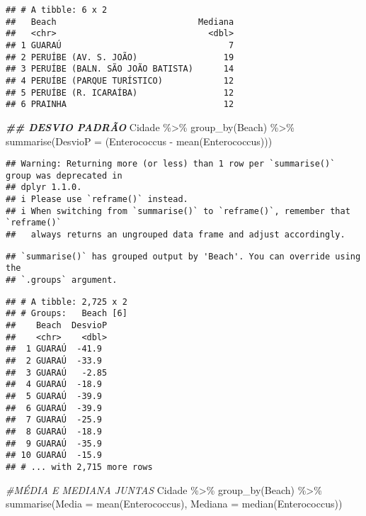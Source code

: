 \documentclass[
]{article}
\newenvironment{Shaded}{\begin{snugshade}}{\end{snugshade}}
\newcommand{\AttributeTok}[1]{\textcolor[rgb]{0.77,0.63,0.00}{#1}}
\newcommand{\CommentTok}[1]{\textcolor[rgb]{0.56,0.35,0.01}{\textit{#1}}}
\newcommand{\DocumentationTok}[1]{\textcolor[rgb]{0.56,0.35,0.01}{\textbf{\textit{#1}}}}
\newcommand{\FunctionTok}[1]{\textcolor[rgb]{0.00,0.00,0.00}{#1}}
\newcommand{\NormalTok}[1]{#1}
\newcommand{\SpecialCharTok}[1]{\textcolor[rgb]{0.00,0.00,0.00}{#1}}
\begin{document}
\begin{verbatim}
## # A tibble: 6 x 2
##   Beach                            Mediana
##   <chr>                              <dbl>
## 1 GUARAÚ                                 7
## 2 PERUÍBE (AV. S. JOÃO)                 19
## 3 PERUÍBE (BALN. SÃO JOÃO BATISTA)      14
## 4 PERUÍBE (PARQUE TURÍSTICO)            12
## 5 PERUÍBE (R. ICARAÍBA)                 12
## 6 PRAINHA                               12
\end{verbatim}

\begin{Shaded}
\begin{Highlighting}[]
\DocumentationTok{\#\# DESVIO PADRÃO}
\NormalTok{Cidade }\SpecialCharTok{\%\textgreater{}\%} \FunctionTok{group\_by}\NormalTok{(Beach) }\SpecialCharTok{\%\textgreater{}\%} \FunctionTok{summarise}\NormalTok{(}\AttributeTok{DesvioP =}\NormalTok{ (Enterococcus }\SpecialCharTok{{-}} \FunctionTok{mean}\NormalTok{(Enterococcus)))}
\end{Highlighting}
\end{Shaded}

\begin{verbatim}
## Warning: Returning more (or less) than 1 row per `summarise()` group was deprecated in
## dplyr 1.1.0.
## i Please use `reframe()` instead.
## i When switching from `summarise()` to `reframe()`, remember that `reframe()`
##   always returns an ungrouped data frame and adjust accordingly.
\end{verbatim}

\begin{verbatim}
## `summarise()` has grouped output by 'Beach'. You can override using the
## `.groups` argument.
\end{verbatim}

\begin{verbatim}
## # A tibble: 2,725 x 2
## # Groups:   Beach [6]
##    Beach  DesvioP
##    <chr>    <dbl>
##  1 GUARAÚ  -41.9 
##  2 GUARAÚ  -33.9 
##  3 GUARAÚ   -2.85
##  4 GUARAÚ  -18.9 
##  5 GUARAÚ  -39.9 
##  6 GUARAÚ  -39.9 
##  7 GUARAÚ  -25.9 
##  8 GUARAÚ  -18.9 
##  9 GUARAÚ  -35.9 
## 10 GUARAÚ  -15.9 
## # ... with 2,715 more rows
\end{verbatim}

\begin{Shaded}
\begin{Highlighting}[]
\CommentTok{\#MÉDIA E MEDIANA JUNTAS}
\NormalTok{Cidade }\SpecialCharTok{\%\textgreater{}\%} \FunctionTok{group\_by}\NormalTok{(Beach) }\SpecialCharTok{\%\textgreater{}\%} \FunctionTok{summarise}\NormalTok{(}\AttributeTok{Media =} \FunctionTok{mean}\NormalTok{(Enterococcus), }\AttributeTok{Mediana =} \FunctionTok{median}\NormalTok{(Enterococcus))}
\end{Highlighting}
\end{Shaded}
\end{document}
